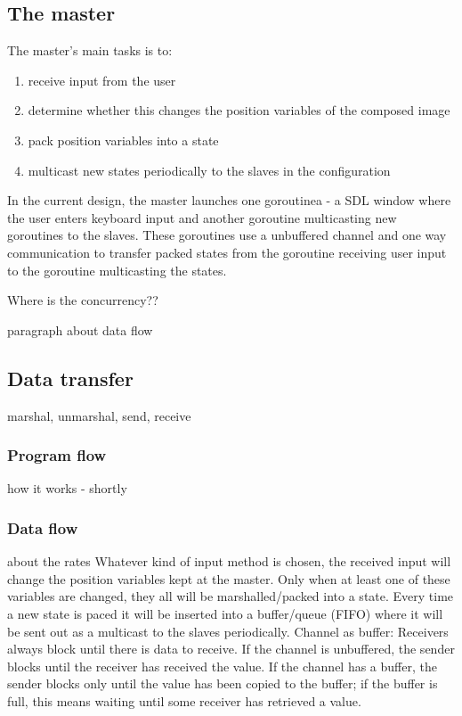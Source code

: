 \documentclass[12pt, a4paper, oneside]{article}
\begin{document}
\subsection{The master}
The master's main tasks is to:
\begin{enumerate}
\item receive input from the user
\item determine whether this changes the position variables of the composed image
\item pack position variables into a state
\item multicast new states periodically to the slaves in the configuration
\end{enumerate}

In the current design, the master launches one goroutinea - a SDL window where the user enters keyboard input and another goroutine multicasting new goroutines to the slaves. These goroutines use a unbuffered channel and one way communication to transfer packed states from the goroutine receiving user input to the goroutine multicasting the states. 


Where is the concurrency??

paragraph about data flow

\subsection{Data transfer}
marshal, unmarshal, send, receive
\subsubsection{Program flow}
how it works  - shortly
\subsubsection{Data flow}
about the rates\newline
Whatever kind of input method is chosen, the received input will change the position variables kept at the master. Only when at least one of these variables are changed, they all will be marshalled/packed into a state. Every time a new state is paced it will be inserted into a buffer/queue (FIFO)  where it will be sent out as a multicast to the slaves periodically.
\newline
\newline
Channel as buffer:
Receivers always block until there is data to receive. If the channel is unbuffered, the sender blocks until the receiver has received the value. If the channel has a buffer, the sender blocks only until the value has been copied to the buffer; if the buffer is full, this means waiting until some receiver has retrieved a value.
\end{document}
